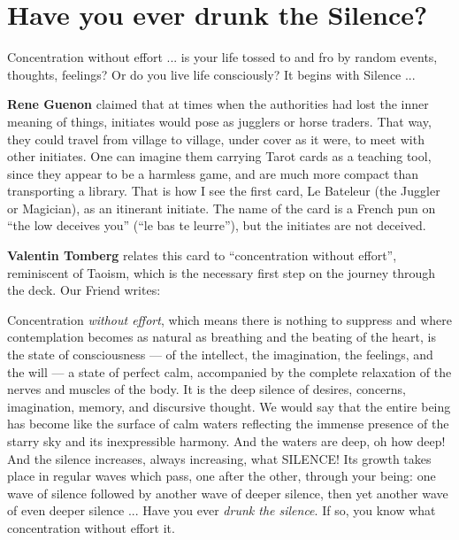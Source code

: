 \section{Have you ever drunk the Silence?}

\begin{quotex}
Concentration without effort ... is your life tossed to and fro by random events, thoughts, feelings? Or do you live life consciously? It begins with Silence ... 
\end{quotex}

\textbf{Rene Guenon} claimed that at times when the authorities had lost the inner meaning of things, initiates would pose as jugglers or horse traders. That way, they could travel from village to village, under cover as it were, to meet with other initiates. One can imagine them carrying Tarot cards as a teaching tool, since they appear to be a harmless game, and are much more compact than transporting a library. That is how I see the first card, Le Bateleur (the Juggler or Magician), as an itinerant initiate. The name of the card is a French pun on ``the low deceives you'' (``le bas te leurre''), but the initiates are not deceived.

\textbf{Valentin Tomberg} relates this card to ``concentration without effort'', reminiscent of Taoism, which is the necessary first step on the journey through the deck. Our Friend writes:

\begin{quotex}
Concentration \emph{without effort}, which means there is nothing to suppress and where contemplation becomes as natural as breathing and the beating of the heart, is the state of consciousness --- of the intellect, the imagination, the feelings, and the will --- a state of perfect calm, accompanied by the complete relaxation of the nerves and muscles of the body. It is the deep silence of desires, concerns, imagination, memory, and discursive thought. We would say that the entire being has become like the surface of calm waters reflecting the immense presence of the starry sky and its inexpressible harmony. And the waters are deep, oh how deep! And the silence increases, always increasing, what SILENCE! Its growth takes place in regular waves which pass, one after the other, through your being: one wave of silence followed by another wave of deeper silence, then yet another wave of even deeper silence ... Have you ever \emph{drunk the silence}. If so, you know what concentration without effort it.
\end{quotex}




